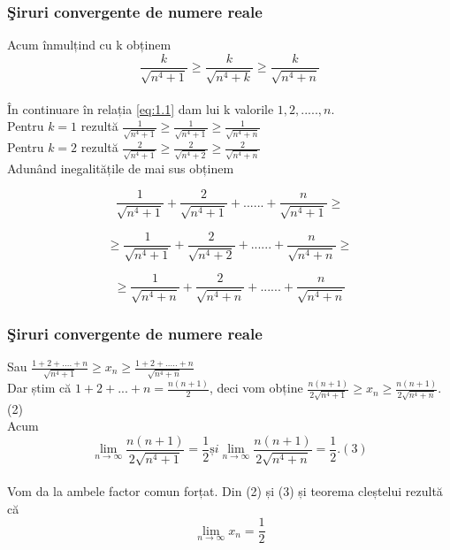 \documentclass{beamer}
\theoremstyle{plain}
\begin{document}
\frame
{
\frametitle{\c Siruri convergente de numere reale}


Acum înmulțind cu k obținem 
\begin{displaymath}
\frac{k}{\sqrt{n^{4}+1}}\geq \frac{k}{\sqrt{n^{4}+k}}\geq \frac{k}{\sqrt{n^{4}+n}} \label{eq:1.1} \tag{1.1}
\end{displaymath}
\\ În continuare în relația \ref{eq:1.1} dam lui k valorile \(1,2,.....,n\). 
\\Pentru \( k = 1\) rezultă
\(\frac{1}{\sqrt{n^{4}+1}}\geq \frac{1}{\sqrt{n^{4}+1}}\geq \frac{1}{\sqrt{n^{4}+n}}\)
\\ Pentru \( k = 2\) rezultă
 \(\frac{2}{\sqrt{n^{4}+1}}\geq \frac{2}{\sqrt{n^{4}+2}}\geq \frac{2}{\sqrt{n^{4}+n}}\)
\\ Adunând inegalitățile de mai sus obținem 

\begin{displaymath}
 \frac{1}{\sqrt{n^{4}+1}}+ \frac{2}{\sqrt{n^{4}+1}}+......+ \frac{n}{\sqrt{n^{4}+1}} \geq 
\end{displaymath}
 
\begin{displaymath}
 \geq \frac{1}{\sqrt{n^{4}+1}}+ \frac{2}{\sqrt{n^{4}+2}}+......+ \frac{n}{\sqrt{n^{4}+n}}\geq
\end{displaymath}
 
\begin{displaymath}
 \geq \frac{1}{\sqrt{n^{4}+n}}+ \frac{2}{\sqrt{n^{4}+n}}+......+ \frac{n}{\sqrt{n^{4}+n}}
\end{displaymath}

}
\frame
{
\frametitle{\c Siruri convergente de numere reale}
Sau \(\frac{1+2+....+n}{\sqrt{n^{4}+1}}\geq x_{n}\geq \frac{1+2+.....+n}{\sqrt{n^{4}+n}}\)
 \\ Dar știm că \(1+2+...+n = \frac{n(n+1)}{2}\), 
 deci vom obține \(\frac{n(n+1)}{2\sqrt{n^{4}+1}}\geq x_{n}\geq \frac{n(n+1)}{2\sqrt{n^{4}+n}}\). (2)
\\ Acum 
\begin{displaymath}
 \lim_{n \to \infty }\frac{n(n+1)}{2\sqrt{n^{4}+1}}=\frac{1}{2} și \lim_{n \to \infty }\frac{n(n+1)}{2\sqrt{n^{4}+n}}=\frac{1}{2}. (3)
\end{displaymath}
\\ Vom da la ambele factor comun forțat. Din (2) și (3) și teorema cleștelui rezultă că
\begin{displaymath}
 \lim_{n \to \infty }x_{n}=\frac{1}{2}
\end{displaymath}
}
\end{document}

